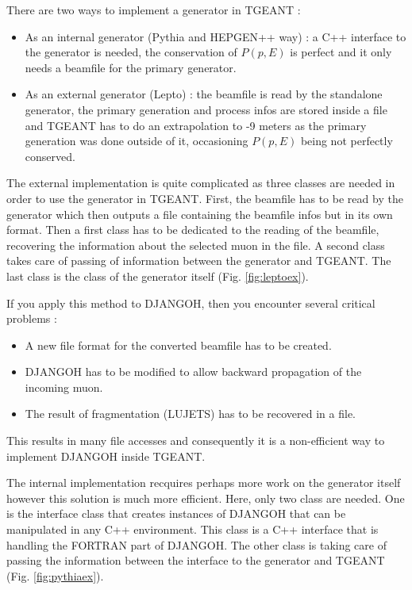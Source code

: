 \documentclass[letterpaper,12pt]{article}
\begin{document}
\newpage
There are two ways to implement a generator in TGEANT :
\begin{itemize}
\item As an internal generator (Pythia and HEPGEN++ way) : a C++ interface to the
generator is needed, the conservation of $P(p,E)$ is perfect and it only needs a
beamfile for the primary generator.
\item As an external generator (Lepto) : the beamfile is read by the standalone
generator, the primary generation and process infos are stored inside a file and
TGEANT has to do an extrapolation to -9 meters as the primary generation was done
outside of it, occasioning $P(p,E)$ being not perfectly conserved.
\end{itemize}

The external implementation is quite complicated as three classes are needed in order
to use the generator in TGEANT. First, the beamfile has to be read by the generator
which then outputs a file containing the beamfile infos but in its own format.
Then a first class has to be dedicated to the reading of the beamfile, recovering
the information about the selected muon in the file. A second class takes care of
passing of information between the generator and TGEANT. The last class is the
class of the generator itself (Fig. \ref{fig:leptoex}).

\newpage
If you apply this method to DJANGOH, then you encounter several critical problems :
\begin{itemize}
\item A new file format for the converted beamfile has to be created.
\item DJANGOH has to be modified to allow backward propagation of the incoming muon.
\item The result of fragmentation (LUJETS) has to be recovered in a file.
\end{itemize}
This results in many file accesses and consequently it is a non-efficient way to
implement DJANGOH inside TGEANT.

The internal implementation recquires perhaps more work on the generator itself however
this solution is much more efficient. Here, only two class are needed. One is the
interface class that creates instances of DJANGOH that can be manipulated in any C++
environment. This class is a C++ interface that is handling the FORTRAN part of DJANGOH.
The other class is taking care of passing the information between the interface to the
generator and TGEANT (Fig. \ref{fig:pythiaex}).
\end{document}
